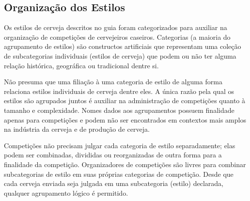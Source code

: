 \subsection*{Organização dos Estilos}

Os estilos de cerveja descritos no guia foram categorizados para auxiliar na organização de competições de cervejeiros caseiros. Categorias (a maioria do agrupamento de estilos) são constructos artificiais que representam uma coleção de subcategorias individuais (estilos de cerveja) que podem ou não ter alguma relação histórica, geográfica ou tradicional dentre si.

Não presuma que uma filiação à uma categoria de estilo de alguma forma relaciona estilos individuais de cerveja dentre eles. A única razão pela qual os estilos são agrupados juntos é auxiliar na administração de competições quanto à tamanho e complexidade. Nomes dados aos agrupamentos possuem finalidade apenas para competições e podem não ser encontrados em contextos mais amplos na indústria da cerveja e de produção de cerveja.

Competições não precisam julgar cada categoria de estilo separadamente; elas podem ser combinadas, divididas ou reorganizadas de outra forma para a finalidade da competição. Organizadores de competições são livres para combinar subcategorias de estilo em suas próprias categorias de competição. Desde que cada cerveja enviada seja julgada em uma subcategoria (estilo) declarada, qualquer agrupamento lógico é permitido.

